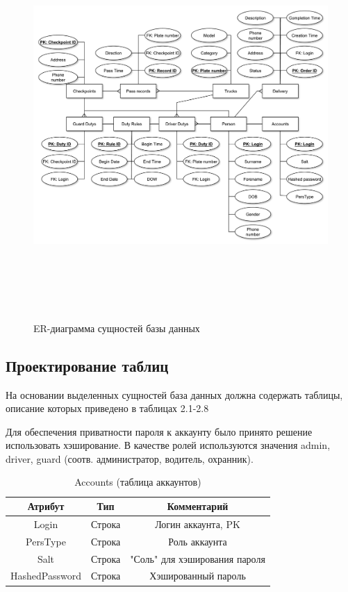 \begin{figure}[ph!]
	\begin{center}
		{\includegraphics[height=14cm, width = 15cm]{schemes/er_db.pdf}}
		\caption{ER-диаграмма сущностей базы данных}
		\label{er_db}
	\end{center}
\end{figure}

\subsection{Проектирование таблиц}
На основании выделенных сущностей база данных должна содержать таблицы, описание которых приведено в таблицах 2.1-2.8

Для обеспечения приватности пароля к аккаунту было принято решение использовать хэширование. В качестве ролей используются значения admin, driver, guard (соотв. администратор, водитель, охранник).
\begin{table}[h] 
	\begin{center}
	\caption{Accounts (таблица аккаунтов)}
	\label{acc_table}
	\begin{tabular}{| c | c | c |}
		\hline
		\textbf{Атрибут}		&	\textbf{Тип}		& \textbf{Комментарий} \\
		\hline
		Login 		&	Строка		&	Логин аккаунта, PK \\ \hline
		PersType 	&	Строка 		&	Роль аккаунта \\ \hline
		Salt 		&	Строка		&	"Соль" для хэширования пароля \\ \hline
		HashedPassword & Строка		&	Хэшированный пароль \\ \hline
	\end{tabular}
	\end{center}
\end{table}

